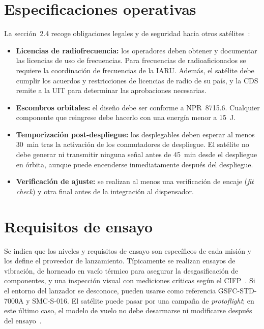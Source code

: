 \section{Especificaciones operativas}\label{sec:cds-operativos}

La sección~2.4 recoge obligaciones legales y de seguridad hacia otros satélites~\cite[Sec.~2.4]{cds14}:

\begin{itemize}
  \item \textbf{Licencias de radiofrecuencia:} los operadores deben obtener y documentar las licencias de uso de frecuencias. Para frecuencias de radioaficionados se requiere la coordinación de frecuencias de la IARU\@. Además, el satélite debe cumplir los acuerdos y restricciones de licencias de radio de su país, y la CDS remite a la UIT para determinar las aprobaciones necesarias.
  \item \textbf{Escombros orbitales:} el diseño debe ser conforme a NPR~8715.6. Cualquier componente que reingrese debe hacerlo con una energía menor a \SI{15}{\joule}.
  \item \textbf{Temporización post-despliegue:} los desplegables deben esperar al menos \SI{30}{\minute} tras la activación de los conmutadores de despliegue. El satélite no debe generar ni transmitir ninguna señal antes de \SI{45}{\minute} desde el despliegue en órbita, aunque puede encenderse inmediatamente después del despliegue.
  \item \textbf{Verificación de ajuste:} se realizan al menos una verificación de encaje (\emph{fit check}) y otra final antes de la integración al dispensador.
\end{itemize}

\section{Requisitos de ensayo}\label{sec:cds-ensayos}

Se indica que los niveles y requisitos de ensayo son específicos de cada misión y los define el proveedor de lanzamiento. Típicamente se realizan ensayos de vibración, de horneado en vacío térmico para asegurar la desgasificación de componentes, y una inspección visual con mediciones críticas según el CIFP~\cite{CIFP}. Si el entorno del lanzador se desconoce, pueden usarse como referencia GSFC-STD-7000A y SMC-S-016. El satélite puede pasar por una campaña de \emph{protoflight}; en este último caso, el modelo de vuelo no debe desarmarse ni modificarse después del ensayo~\cite{cds14}.

